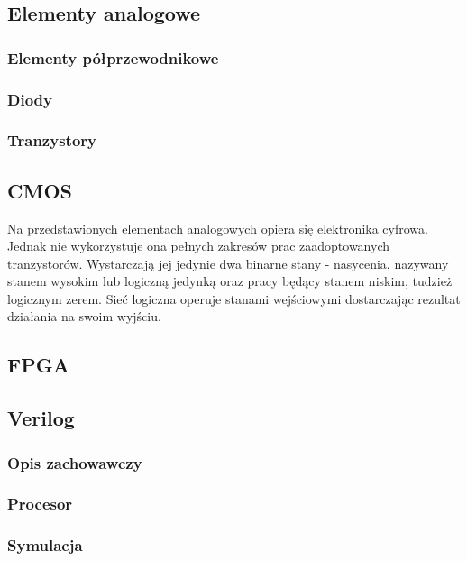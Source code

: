 \documentclass[a4paper,12pt]{article}
\begin{document}
\subsection{Elementy analogowe}

\subsubsection{Elementy półprzewodnikowe}

\subsubsection{Diody}

\subsubsection{Tranzystory}


\subsection{CMOS}

Na przedstawionych elementach analogowych opiera się elektronika cyfrowa. Jednak nie wykorzystuje ona pełnych zakresów prac zaadoptowanych tranzystorów. Wystarczają jej jedynie dwa binarne stany - nasycenia, nazywany stanem wysokim lub logiczną jedynką oraz pracy będący stanem niskim, tudzież logicznym zerem. Sieć logiczna operuje stanami wejściowymi dostarczając rezultat działania na swoim wyjściu.



\subsection{FPGA}


\subsection{Verilog}

\subsubsection{Opis zachowawczy}

\subsubsection{Procesor}

\subsubsection{Symulacja}
\end{document}
